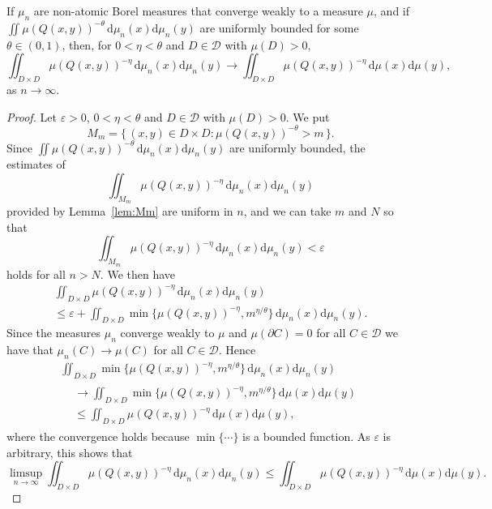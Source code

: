 \documentclass[10pt]{amsart}
\theoremstyle{definition}\newtheorem{defi}[theo]{Definition}\newtheorem{rema}[theo]{Remark}\newtheorem{exam}[theo]{Example}\newtheorem{exem}[theo]{Example}\newtheorem{nota}[theo]{Notation}
\newcommand*{\dd}{\mathrm{d}}
\begin{document}
\begin{coro}\label{cor:energyconvergence}
If $\mu_n$ are non-atomic Borel measures that converge weakly to a measure $\mu$, and if $\iint \mu (Q(x,y))^{-\theta} \, \dd
\mu_n (x) \dd \mu_n (y)$ are uniformly bounded for some $\theta \in (0,1)$, then, for $0 < \eta < \theta$ and $D \in
\mathscr{D}$ with $\mu (D) > 0$,
\[
\iint_{D \times D} \mu (Q(x,y))^{-\eta} \, \dd \mu_n (x)
\dd \mu_n (y) \to \iint_{D \times D} \mu (Q(x,y))^{-\eta} \,
\dd \mu (x) \dd \mu (y),
\]
as $n \to \infty$.
\end{coro}

\begin{proof}
Let $\varepsilon > 0$, $0 < \eta < \theta$ and $D \in
\mathscr{D}$ with $\mu (D) > 0$. We put
\[
M_m = \{\, (x,y) \in D \times D: \mu (Q(x,y))^{-\theta} > m \,\}.
\]
Since $\iint \mu (Q(x,y))^{-\theta} \, \dd \mu_n (x)
\dd \mu_n (y)$ are uniformly bounded, the estimates of
\[
\iint_{M_m} \mu (Q (x,y))^{-\eta} \, \dd \mu_n (x) \dd
\mu_n (y)
\]
provided by Lemma~\ref{lem:Mm} are uniform in $n$, and we can take $m$ and $N$ so that
\[
\iint_{M_m} \mu (Q (x,y))^{-\eta} \, \dd \mu_n (x) \dd
\mu_n (y) < \varepsilon
\]
holds for all $n > N$. We then have
\begin{multline*}
\iint_{D \times D} \mu (Q (x,y))^{-\eta} \, \dd\mu_n (x)
\dd\mu_n (y) \\ \leq \varepsilon + \iint_{D \times D} \min \{
\mu(Q (x,y))^{-\eta}, m^{\eta/\theta} \} \, \dd\mu_n (x)
\dd \mu_n (y).
\end{multline*}
Since the measures $\mu_n$ converge weakly to $\mu$ and $\mu (\partial C) = 0$ for all $C \in \mathscr{D}$ we have that $\mu_n (C) \to \mu (C)$ for all $C \in \mathscr{D}$. Hence
\begin{multline*}
\iint_{D \times D} \min \{ \mu(Q (x,y))^{-\eta}, m^{\eta/\theta} \} \,
\dd\mu_n (x) \dd \mu_n (y) \\
\begin{aligned}
&\to \iint_{D \times D} \min \{
\mu(Q (x,y))^{-\eta}, m^{\eta/\theta} \} \, \dd\mu (x) \dd \mu (y)\\
&\leq \iint_{D \times D} \mu(Q (x,y))^{-\eta} \, \dd \mu (x)
\dd \mu (y),
\end{aligned}
\end{multline*}
where the convergence holds because $\min \{ \cdots \}$ is a bounded function. As $\varepsilon$ is arbitrary, this shows that
\[
\limsup_{n\to \infty} \iint_{D \times D} \mu (Q (x,y))^{-\eta} \,
\dd \mu_n (x) \dd \mu_n (y) \leq \iint_{D \times D} \mu(Q (x,y))^{-\eta} \, \dd\mu (x) \dd \mu (y).
\]


\end{proof}
\end{document}
